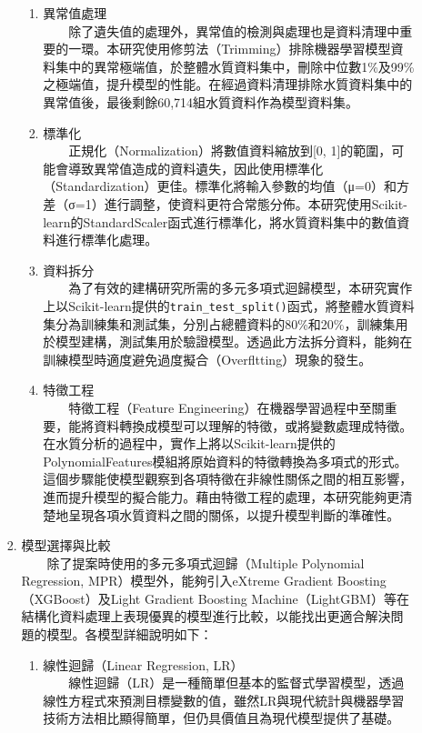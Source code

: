 \documentclass[12pt,a4paper]{article}
\begin{document}
\begin{enumerate}
\begin{enumerate}[label=\arabic*.]
\begin{enumerate}[label=2-2-\arabic*.]
\begin{enumerate}[label=\Alph*.]
                \item 異常值處理\\
                　　除了遺失值的處理外，異常值的檢測與處理也是資料清理中重要的一環。本研究使用修剪法（Trimming）排除機器學習模型資料集中的異常極端值，於整體水質資料集中，刪除中位數1\%及99\%之極端值，提升模型的性能\cite{ref25}。在經過資料清理排除水質資料集中的異常值後，最後剩餘60,714組水質資料作為模型資料集。
                \item 標準化\\
                　　正規化（Normalization）將數值資料縮放到[0, 1]的範圍，可能會導致異常值造成的資料遺失，因此使用標準化（Standardization）更佳。標準化將輸入參數的均值（μ=0）和方差（σ=1）進行調整，使資料更符合常態分佈\cite{ref26}。本研究使用Scikit-learn的StandardScaler函式進行標準化，將水質資料集中的數值資料進行標準化處理。
                \item 資料拆分\\
                　　為了有效的建構研究所需的多元多項式迴歸模型，本研究實作上以Scikit-learn提供的\texttt{train\_test\_split()}函式，將整體水質資料集分為訓練集和測試集，分別占總體資料的80\%和20\%，訓練集用於模型建構，測試集用於驗證模型\cite{ref27}。透過此方法拆分資料，能夠在訓練模型時適度避免過度擬合（Overfltting）現象的發生。
                \item 特徵工程\\
                　　特徵工程（Feature Engineering）在機器學習過程中至關重要，能將資料轉換成模型可以理解的特徵，或將變數處理成特徵\cite{ref28}。在水質分析的過程中，實作上將以Scikit-learn提供的PolynomialFeatures模組將原始資料的特徵轉換為多項式的形式。這個步驟能使模型觀察到各項特徵在非線性關係之間的相互影響，進而提升模型的擬合能力。藉由特徵工程的處理，本研究能夠更清楚地呈現各項水質資料之間的關係，以提升模型判斷的準確性。
            \end{enumerate}
        \item 模型選擇與比較\\
        　　除了提案時使用的多元多項式迴歸（Multiple Polynomial Regression, MPR）模型外，能夠引入eXtreme Gradient Boosting（XGBoost）及Light Gradient Boosting Machine（LightGBM）等在結構化資料處理上表現優異的模型進行比較，以能找出更適合解決問題的模型。各模型詳細說明如下：
            \begin{enumerate}[label=\Alph*.]
                \item 線性迴歸（Linear Regression, LR）\\
                　　線性迴歸（LR）是一種簡單但基本的監督式學習模型，透過線性方程式來預測目標變數的值，雖然LR與現代統計與機器學習技術方法相比顯得簡單，但仍具價值且為現代模型提供了基礎\cite{ref29}。

\end{enumerate}
\end{enumerate}
\end{enumerate}
\end{enumerate}
\end{document}
